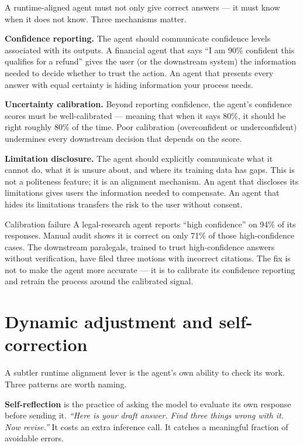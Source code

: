 A runtime-aligned agent must not only give correct answers --- it must know when it does not know. Three mechanisms matter.

\textbf{Confidence reporting.} The agent should communicate confidence levels associated with its outputs. A financial agent that says ``I am 90\% confident this qualifies for a refund'' gives the user (or the downstream system) the information needed to decide whether to trust the action. An agent that presents every answer with equal certainty is hiding information your process needs.

\textbf{Uncertainty calibration.} Beyond reporting confidence, the agent's confidence scores must be well-calibrated --- meaning that when it says 80\%, it should be right roughly 80\% of the time. Poor calibration (overconfident or underconfident) undermines every downstream decision that depends on the score.

\textbf{Limitation disclosure.} The agent should explicitly communicate what it cannot do, what it is unsure about, and where its training data has gaps. This is not a politeness feature; it is an alignment mechanism. An agent that discloses its limitations gives users the information needed to compensate. An agent that hides its limitations transfers the risk to the user without consent.

\begin{TNinpractice}{Calibration failure} A legal-research agent reports ``high confidence'' on 94\% of its responses. Manual audit shows it is correct on only 71\% of those high-confidence cases. The downstream paralegals, trained to trust high-confidence answers without verification, have filed three motions with incorrect citations. The fix is not to make the agent more accurate --- it is to calibrate its confidence reporting and retrain the process around the calibrated signal. \end{TNinpractice}

\section{Dynamic adjustment and self-correction}

A subtler runtime alignment lever is the agent's own ability to check its work. Three patterns are worth naming.

\textbf{Self-reflection} is the practice of asking the model to evaluate its own response before sending it. \textit{``Here is your draft answer. Find three things wrong with it. Now revise.''} It costs an extra inference call. It catches a meaningful fraction of avoidable errors.

